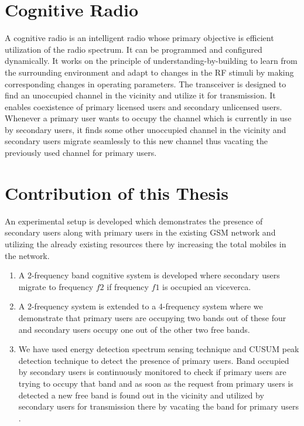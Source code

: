 \section{Cognitive Radio}
A cognitive radio is an intelligent radio whose primary objective is efficient
utilization of the radio spectrum. It can be programmed and configured 
dynamically. It works on the principle of understanding-by-building to learn 
from the surrounding environment and adapt to changes in the RF stimuli by 
making corresponding changes in operating parameters. The transceiver is 
designed to find an unoccupied channel in the vicinity and utilize it for 
transmission. It enables coexistence of primary licensed users and secondary 
unlicensed users. Whenever a primary user wants to occupy the channel which is
currently in use by secondary users, it finds some other unoccupied channel in
the vicinity and secondary users migrate seamlessly to this new channel thus 
vacating the previously used channel for primary users.  

\section{Contribution of this Thesis}
An experimental setup is developed which demonstrates the presence of 
secondary users along with primary users in the existing GSM network and 
utilizing the already existing resources there by increasing the total 
mobiles in the network.
\begin{enumerate}
  \item A 2-frequency band cognitive system is developed where secondary 
  users migrate to frequency $f2$ if frequency $f1$ is occupied an viceverca.
  \item A 2-frequency system is extended to a 4-frequency system where 
  we demonstrate that primary users are occupying two bands out of these four
  and secondary users occupy one out of the other two free bands.
  \item We have used energy detection spectrum sensing technique and CUSUM
  peak detection technique to detect the presence of primary users. Band 
  occupied by secondary users is continuously monitored to check if primary 
  users are trying to occupy that band and as soon as the request from primary
  users is detected a new free band is found out in the vicinity and utilized 
  by secondary users for transmission there by vacating the band for primary 
  users . 
\end{enumerate}

